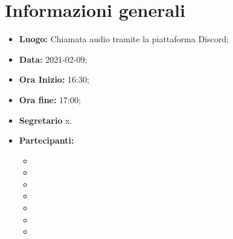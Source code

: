 \section{Informazioni generali}
	\begin{itemize}
		\item \textbf{Luogo:} Chiamata audio tramite la piattaforma Discord;
		\item \textbf{Data:} 2021-02-09;
		\item \textbf{Ora Inizio:} 16:30;
		\item \textbf{Ora fine:} 17:00;
		\item \textbf{Segretario} x.
		\item \textbf{Partecipanti:}
		\begin{itemize}
			\item \MB
			\item \VAS
			\item \FD
			\item \NM
			\item \SB
			\item \GB
			\item \MDI
		\end{itemize}
		
	\end{itemize}